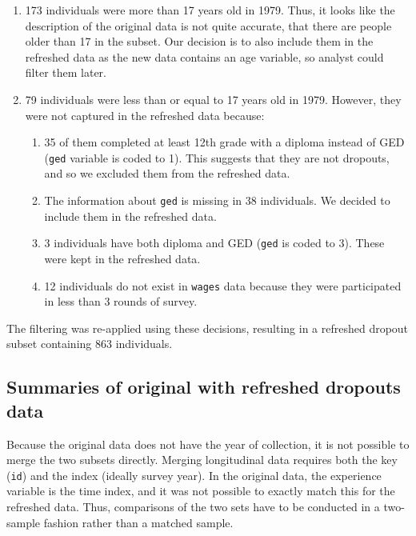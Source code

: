 \documentclass{article}
\providecommand{\tightlist}{%
  \setlength{\itemsep}{0pt}\setlength{\parskip}{0pt}}
\begin{document}
\begin{enumerate}
\def\labelenumi{\arabic{enumi}.}
\tightlist
\item
  173 individuals were more than 17 years old in 1979. Thus, it looks like the description of the original data is not quite accurate, that there are people older than 17 in the subset. Our decision is to also include them in the refreshed data as the new data contains an age variable, so analyst could filter them later.
\item
  79 individuals were less than or equal to 17 years old in 1979. However, they were not captured in the refreshed data because:

  \begin{enumerate}
  \def\labelenumii{\roman{enumii}.}
  \tightlist
  \item
    35 of them completed at least 12th grade with a diploma instead of GED (\texttt{ged} variable is coded to 1). This suggests that they are not dropouts, and so we excluded them from the refreshed data.
  \item
    The information about \texttt{ged} is missing in 38 individuals. We decided to include them in the refreshed data.
  \item
    3 individuals have both diploma and GED (\texttt{ged} is coded to 3). These were kept in the refreshed data.
  \item
    12 individuals do not exist in \texttt{wages} data because they were participated in less than 3 rounds of survey.
  \end{enumerate}
\end{enumerate}

The filtering was re-applied using these decisions, resulting in a refreshed dropout subset containing 863 individuals.

\hypertarget{summaries-of-original-with-refreshed-dropouts-data}{%
\subsection{Summaries of original with refreshed dropouts data}\label{summaries-of-original-with-refreshed-dropouts-data}}

Because the original data does not have the year of collection, it is not possible to merge the two subsets directly. Merging longitudinal data requires both the key (\texttt{id}) and the index (ideally survey year). In the original data, the experience variable is the time index, and it was not possible to exactly match this for the refreshed data. Thus, comparisons of the two sets have to be conducted in a two-sample fashion rather than a matched sample.
\end{document}
